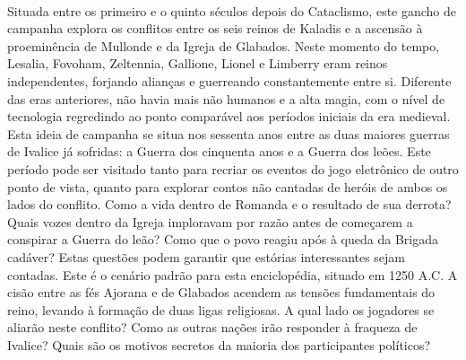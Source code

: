 \begin{multicols}{2}
%
\columnbreak\\
%
Situada entre os primeiro e o quinto séculos depois do Cataclismo, este gancho de campanha explora os conflitos entre os seis reinos de Kaladis e a ascensão à proeminência de Mullonde e da Igreja de Glabados.
Neste momento do tempo, Lesalia, Fovoham, Zeltennia, Gallione, Lionel e Limberry eram reinos independentes, forjando alianças e guerreando constantemente entre si.
Diferente das eras anteriores, não havia mais não humanos e a alta magia, com o nível de tecnologia regredindo ao ponto comparável aos períodos iniciais da era medieval.
%
\ofpar
%
Esta ideia de campanha se situa nos sessenta anos entre as duas maiores guerras de Ivalice já sofridas: a Guerra dos cinquenta anos e a Guerra dos leões.
Este período pode ser visitado tanto para recriar os eventos do jogo eletrônico de outro ponto de vista, quanto para explorar contos não cantadas de heróis de ambos os lados do conflito.
Como a vida dentro de Romanda e o resultado de sua derrota?
Quais vozes dentro da Igreja imploravam por razão antes de começarem a conspirar a Guerra do leão?
Como que o povo reagiu após à queda da Brigada cadáver?
Estas questões podem garantir que estórias interessantes sejam contadas.
%
\ofpar
%
Este é o cenário padrão para esta enciclopédia, situado em 1250 A.C.
A cisão entre as fés Ajorana e de Glabados acendem as tensões fundamentais do reino, levando à formação de duas ligas religiosas.
A qual lado os jogadores se aliarão neste conflito?
Como as outras nações irão responder à fraqueza de Ivalice?
Quais são os motivos secretos da maioria dos participantes políticos?
%
\end{multicols}
%
\vfill
%
\hspace*{\fill}\hspace*{\fill}\\
%
\twocolumn
\clearpage
%
